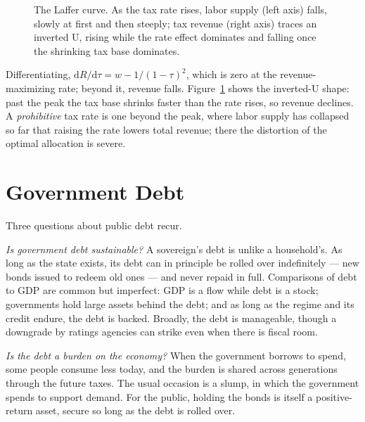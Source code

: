 \begin{figure}[h]
\centering

\caption{The Laffer curve. As the tax rate rises, labor supply (left axis) falls, slowly at first and then steeply; tax revenue (right axis) traces an inverted U, rising while the rate effect dominates and falling once the shrinking tax base dominates.}
\label{fig:macro-30}
\end{figure}

Differentiating, $\mathrm{d}R/\mathrm{d}\tau = w - 1/(1-\tau)^2$, which is zero at the revenue-maximizing rate; beyond it, revenue falls. Figure~\ref{fig:macro-30} shows the inverted-U shape: past the peak the tax base shrinks faster than the rate rises, so revenue declines. A \emph{prohibitive} tax rate is one beyond the peak, where labor supply has collapsed so far that raising the rate lowers total revenue; there the distortion of the optimal allocation is severe.


\section{Government Debt}

Three questions about public debt recur.

\emph{Is government debt sustainable?} A sovereign's debt is unlike a household's. As long as the state exists, its debt can in principle be rolled over indefinitely --- new bonds issued to redeem old ones --- and never repaid in full. Comparisons of debt to GDP are common but imperfect: GDP is a flow while debt is a stock; governments hold large assets behind the debt; and as long as the regime and its credit endure, the debt is backed. Broadly, the debt is manageable, though a downgrade by ratings agencies can strike even when there is fiscal room.

\emph{Is the debt a burden on the economy?} When the government borrows to spend, some people consume less today, and the burden is shared across generations through the future taxes. The usual occasion is a slump, in which the government spends to support demand. For the public, holding the bonds is itself a positive-return asset, secure so long as the debt is rolled over.

